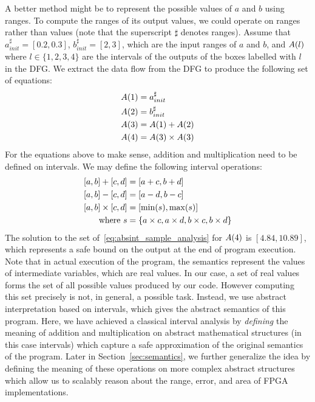 A better method might be to represent the possible values of $a$ and $b$ using
ranges. To compute the ranges of its output values, we could operate on ranges
rather than values (note that the superscript $\sharp$ denotes ranges). Assume
that $a^\sharp_{init} = [0.2, 0.3]$, $b^\sharp_{init} = [2, 3]$, which are the
input ranges of $a$ and $b$, and $A({l})$ where $l \in \{1, 2, 3, 4\}$ are
the intervals of the outputs of the boxes labelled with $l$ in the DFG\@. We
extract the data flow from the DFG to produce the following set of equations:
\begin{equation}
    \begin{aligned}
        A({1}) &= a^\sharp_{init} \\
        A({2}) &= b^\sharp_{init} \\
        A({3}) &= A({1}) + A({2}) \\
        A({4}) &= A({3}) \times A({3})
    \end{aligned}
    \label{eq:absint_sample_analysis}
\end{equation}
For the equations above to make sense, addition and multiplication need to be
defined on intervals. We may define the following interval operations:
\begin{equation}
    \begin{aligned}
        \left[{a}, {b}\right] + \left[{c}, {d}\right] &= \left[{a + c}, {b + d}\right] \\
        \left[{a}, {b}\right] - \left[{c}, {d}\right] &=  \left[{a - d}, {b - c}\right] \\
        \left[{a}, {b}\right] \times \left[{c}, {d}\right] &=
            \left[{\min(s)}, {\max(s)}\right] \\
        \text{where~} s &= \{ a \times c, a \times d, b \times c, b \times d \}
    \end{aligned}
    \label{eq:interval_operations}
\end{equation}
The solution to the set of~\eqref{eq:absint_sample_analysis} for $A({4})$
is $[4.84, 10.89]$, which represents a safe bound on the output at the end of
program execution. Note that in actual execution of the program, the semantics
represent the values of intermediate variables, which are real values. In our
case, a set of real values forms the set of all possible values produced by
our code. However computing this set precisely is not, in general, a possible
task. Instead, we use abstract interpretation based on intervals, which gives
the abstract semantics of this program. Here, we have achieved a classical
interval analysis by \emph{defining} the meaning of addition and multiplication
on abstract mathematical structures (in this case intervals) which capture
a safe approximation of the original semantics of the program. Later in
Section~\ref{sec:semantics}, we further generalize the idea by defining the
meaning of these operations on more complex abstract structures which allow us
to scalably reason about the range, error, and area of FPGA implementations.
